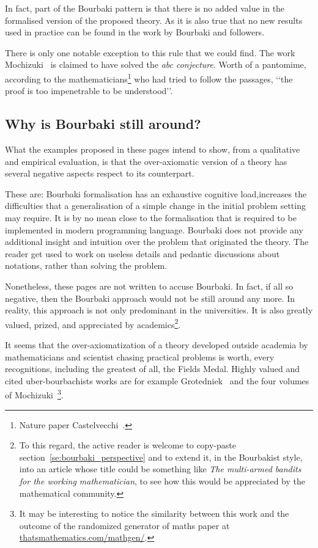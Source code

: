 \documentclass[]{scrartcl}
\theoremstyle{definition}
\begin{document}
In fact, part of the Bourbaki pattern is that there is no added value in the formalised version of the proposed theory. As it is also true that no new results used in practice can be found in the work by Bourbaki and followers.

There is only one notable exception to this rule that we could find. The work Mochizuki~\cite{mochizuki2012inter} is claimed to have solved the \emph{abc conjecture}. Worth of a pantomime, according to the mathematicians\footnote{Nature paper Castelvecchi~\cite{castelvecchi2015biggest}.} who had tried to follow the passages, \lq\lq the proof is too impenetrable to be understood\rq\rq.

\subsection*{Why is Bourbaki still around?}

What the examples proposed in these pages intend to show, from a qualitative and empirical evaluation, is that the over-axiomatic version of a theory has several negative aspects respect to its counterpart.

These are: Bourbaki formalisation has an exhaustive cognitive load,increases the difficulties that a generalisation of a simple change in the initial problem setting may require. It is by no mean close to the formalisation that is required to be implemented in modern programming language. Bourbaki does not provide any additional insight and intuition over the problem that originated the theory. The reader get used to work on useless details and pedantic discussions about notations, rather than solving the problem.

Nonetheless, these pages are not written to accuse Bourbaki. In fact, if all so negative, then the Bourbaki approach would not be still around any more. In reality, this approach is not only predominant in the universities. It is also greatly valued, prized, and appreciated by academics\footnote{
    To this regard, the active reader is welcome to copy-paste section~\ref{se:bourbaki_perspective} and to extend it, in the Bourbakist style, into an article whose title could be something like \emph{The multi-armed bandits for the working mathematician}, to see how this would be appreciated by the mathematical community.
}.

It seems that the over-axiomatization of a theory developed outside academia by mathematicians and scientist chasing practical problems is worth, every recognitions, including the greatest of all, the Fields Medal.
Highly valued and cited uber-bourbachists works are for example Grotedniek~\cite{grothendieck2011some} and the four volumes of Mochizuki~\cite{mochizuki2012inter}\footnote{
    It may be interesting to notice the similarity between this work and the outcome of the randomized generator of maths paper at \href{https://thatsmathematics.com/mathgen/}{thatsmathematics.com/mathgen/}.
}. 
\end{document}
